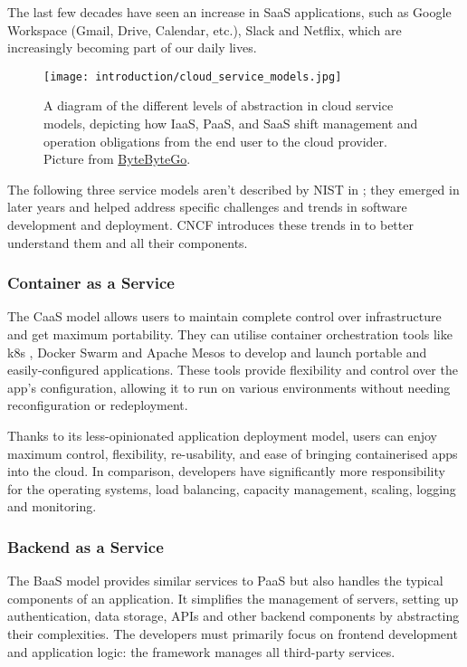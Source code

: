 \documentclass[../thesis.tex]{subfiles}
\begin{document}
The last few decades have seen an increase in SaaS applications, such as Google Workspace (Gmail, Drive, Calendar, etc.), Slack and Netflix, which are increasingly becoming part of our daily lives.

\begin{figure}[H]
    \centering
    \texttt{[image: introduction/cloud\_service\_models.jpg]}
    \caption[Levels of abstraction of the different cloud service models]{A diagram of the different levels of abstraction in cloud service models, depicting how IaaS, PaaS, and SaaS shift management and operation obligations from the end user to the cloud provider. Picture from \href{https://blog.bytebytego.com/i/54898662/what-is-iaaspaassaas}{ByteByteGo}.}
    \label{fig:cloud_service_models}
\end{figure}

\newpage
\noindent
The following three service models aren't described by \acrshort{NIST} in \cite{article:nist_services_evaluation_2018}; they emerged in later years and helped address specific challenges and trends in software development and deployment. \acrfull{CNCF} introduces these trends in \cite{site:cncf_serverless} to better understand them and all their components.

\subsubsection{Container as a Service}
The CaaS model allows users to maintain complete control over infrastructure and get maximum portability. They can utilise container orchestration tools like \gls{k8s} \cite{article:k8s_history, site:k8s}, Docker Swarm and Apache Mesos to develop and launch portable and easily-configured applications. These tools provide flexibility and control over the app's configuration, allowing it to run on various environments without needing reconfiguration or redeployment.

Thanks to its less-opinionated application deployment model, users can enjoy maximum control, flexibility, re-usability, and ease of bringing containerised apps into the cloud. In comparison, developers have significantly more responsibility for the operating systems, load balancing, capacity management, scaling, logging and monitoring.

\subsubsection{Backend as a Service}
The BaaS model provides similar services to PaaS but also handles the typical components of an application. It simplifies the management of servers, setting up authentication, data storage, \acrshort{API}s and other backend components by abstracting their complexities. The developers must primarily focus on frontend development and application logic: the framework manages all third-party services.
\end{document}
